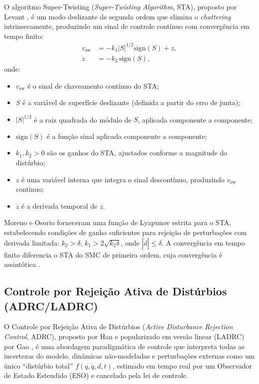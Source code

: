 O algoritmo Super-Twisting (\textit{Super-Twisting Algorithm}, STA), proposto por Levant \cite{levant1993sliding}, é um modo deslizante de segunda ordem que elimina o \textit{chattering} intrinsecamente, produzindo um sinal de controle contínuo com convergência em tempo finito:
\begin{align}
    v_{\text{sw}} &= -k_1 |S|^{1/2} \text{sign}(S) + z, \label{eq:sta1}\\
    \dot{z} &= -k_2 \,\text{sign}(S), \label{eq:sta2}
\end{align}
onde:
\begin{itemize}
    \item $v_{\text{sw}}$ é o sinal de chaveamento contínuo do STA;
    \item $S$ é a variável de superfície deslizante (definida a partir do erro de junta);
    \item $|S|^{1/2}$ é a raiz quadrada do módulo de $S$, aplicada componente a componente;
    \item $\text{sign}(S)$ é a função sinal aplicada componente a componente;
    \item $k_1, k_2 > 0$ são os ganhos do STA, ajustados conforme a magnitude do distúrbio;
    \item $z$ é uma variável interna que integra o sinal descontínuo, produzindo $v_{\text{sw}}$ contínuo;
    \item $\dot{z}$ é a derivada temporal de $z$.
\end{itemize} Moreno e Osorio \cite{moreno2012strict} forneceram uma função de Lyapunov estrita para o STA, estabelecendo condições de ganho suficientes para rejeição de perturbações com derivada limitada: $k_2 > \delta$, $k_1 > 2\sqrt{k_2 \delta}$, onde $|\dot{d}| \leq \delta$. A convergência em tempo finito diferencia o STA do SMC de primeira ordem, cuja convergência é assintótica \cite{utkin2017sliding}.

\subsection{Controle por Rejeição Ativa de Distúrbios (ADRC/LADRC)}

O Controle por Rejeição Ativa de Distúrbios (\textit{Active Disturbance Rejection Control}, ADRC), proposto por Han \cite{han1995class} e popularizado em versão linear (LADRC) por Gao \cite{gao2003scaling}, é uma abordagem paradigmática de controle que interpreta todas as incertezas do modelo, dinâmicas não-modeladas e perturbações externas como um único ``distúrbio total'' $f(q,\dot{q},d,t)$, estimado em tempo real por um Observador de Estado Estendido (ESO) e cancelado pela lei de controle.

